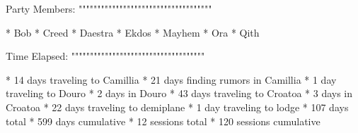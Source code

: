 Party Members:
""""""""""""""""""""""""""""""""""""

  * Bob
  * Creed
  * Daestra
  * Ekdos
  * Mayhem
  * Ora
  * Qith

Time Elapsed:
""""""""""""""""""""""""""""""""""""

  * 14 days traveling to Camillia
  * 21 days finding rumors in Camillia
  * 1 day traveling to Douro
  * 2 days in Douro
  * 43 days traveling to Croatoa
  * 3 days in Croatoa
  * 22 days traveling to demiplane
  * 1 day traveling to lodge
  * 107 days total
  * 599 days cumulative
  * 12 sessions total
  * 120 sessions cumulative
